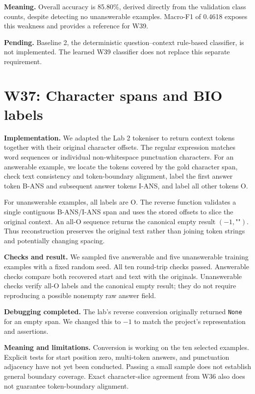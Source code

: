 \documentclass[11pt,a4paper]{article}
\begin{document}
\textbf{Meaning.} Overall accuracy is 85.80\%, derived directly from the validation class counts, despite detecting no unanswerable examples. Macro-F1 of 0.4618 exposes this weakness and provides a reference for W39.

\textbf{Pending.} Baseline 2, the deterministic question--context rule-based classifier, is not implemented. The learned W39 classifier does not replace this separate requirement.

\section{W37: Character spans and BIO labels}
\textbf{Implementation.} We adapted the Lab 2 tokeniser to return context tokens together with their original character offsets. The regular expression matches word sequences or individual non-whitespace punctuation characters. For an answerable example, we locate the tokens covered by the gold character span, check text consistency and token-boundary alignment, label the first answer token B-ANS and subsequent answer tokens I-ANS, and label all other tokens O.

For unanswerable examples, all labels are O. The reverse function validates a single contiguous B-ANS/I-ANS span and uses the stored offsets to slice the original context. An all-O sequence returns the canonical empty result $(-1,\texttt{""})$. Thus reconstruction preserves the original text rather than joining token strings and potentially changing spacing.

\textbf{Checks and result.} We sampled five answerable and five unanswerable training examples with a fixed random seed. All ten round-trip checks passed. Answerable checks compare both recovered start and text with the originals. Unanswerable checks verify all-O labels and the canonical empty result; they do not require reproducing a possible nonempty raw answer field.

\textbf{Debugging completed.} The lab's reverse conversion originally returned \texttt{None} for an empty span. We changed this to $-1$ to match the project's representation and assertions.

\textbf{Meaning and limitations.} Conversion is working on the ten selected examples. Explicit tests for start position zero, multi-token answers, and punctuation adjacency have not yet been conducted. Passing a small sample does not establish general boundary coverage. Exact character-slice agreement from W36 also does not guarantee token-boundary alignment.
\end{document}
